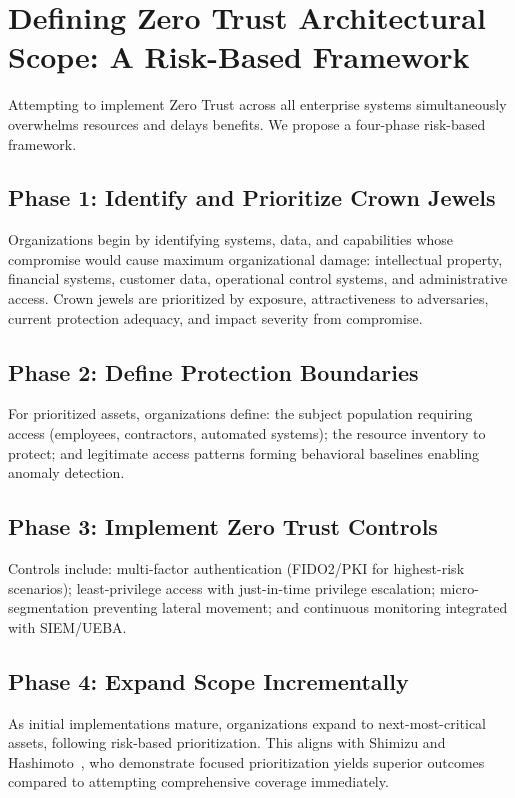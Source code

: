 \documentclass[journal]{IEEEtran}
\begin{document}
\section{Defining Zero Trust Architectural Scope: A Risk-Based Framework}

Attempting to implement Zero Trust across all enterprise systems simultaneously overwhelms
resources and delays benefits. We propose a four-phase risk-based framework.

\subsection{Phase 1: Identify and Prioritize Crown Jewels}

Organizations begin by identifying systems, data, and capabilities whose compromise would
cause maximum organizational damage: intellectual property, financial systems, customer
data, operational control systems, and administrative access. Crown jewels are prioritized
by exposure, attractiveness to adversaries, current protection adequacy, and impact
severity from compromise.

\subsection{Phase 2: Define Protection Boundaries}

For prioritized assets, organizations define: the subject population requiring access
(employees, contractors, automated systems); the resource inventory to protect; and
legitimate access patterns forming behavioral baselines enabling anomaly detection.

\subsection{Phase 3: Implement Zero Trust Controls}

Controls include: multi-factor authentication (FIDO2/PKI for highest-risk scenarios);
least-privilege access with just-in-time privilege escalation; micro-segmentation
preventing lateral movement; and continuous monitoring integrated with SIEM/UEBA.

\subsection{Phase 4: Expand Scope Incrementally}

As initial implementations mature, organizations expand to next-most-critical assets,
following risk-based prioritization. This aligns with Shimizu and
Hashimoto~\cite{shimizu2025vulnerability}, who demonstrate focused prioritization yields
superior outcomes compared to attempting comprehensive coverage immediately.
\end{document}
